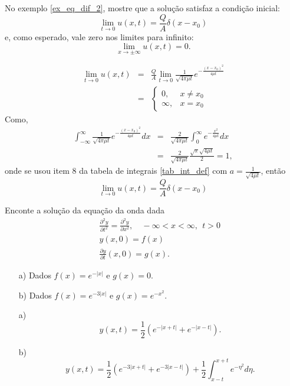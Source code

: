\begin{Exercise}No exemplo \ref{ex_eq_dif_2}, mostre que a solução satisfaz a condição inicial: 
$$
\lim_{t\to 0}u(x,t)=\frac{Q}{A}\delta(x-x_0)
$$
e, como esperado, vale zero nos limites para infinito:
$$
\lim_{x\to\pm\infty}u(x,t)=0.
$$
\end{Exercise}
\begin{Answer}
\begin{eqnarray*}
\lim_{t\to 0} u(x,t)&=&\frac{Q}{A}\lim_{t\to 0} \frac{1}{\sqrt{4\pi \mu t}}e^{-\frac{(x-x_0)^2}{4\mu t}}\\
&=&\left\{\begin{array}{ll}0,&x\neq x_0\\ \infty, &x=x_0\end{array}\right.
\end{eqnarray*}
Como,
\begin{eqnarray*}
\int_{-\infty}^\infty\frac{1}{\sqrt{4\pi \mu t}}e^{-\frac{(x-x_0)^2}{4\mu t}}dx&=&\frac{2}{\sqrt{4\pi \mu t}}\int_{0}^\infty e^{-\frac{x^2}{4\mu t}}dx\\
&=&\frac{2}{\sqrt{4\pi \mu t}}\frac{\sqrt{\pi} \sqrt{4\mu t}}{2}=1,
\end{eqnarray*}
onde se usou item 8 da tabela de integrais \ref{tab_int_def} com $a=\frac{1}{\sqrt{4\mu t}}$, então
$$
\lim_{t\to 0} u(x,t)=\frac{Q}{A} \delta(x-x_0)
$$
\end{Answer}
\begin{Exercise} Enconte a solução da equação da onda dada
\begin{eqnarray*}
&&\frac{\partial^2 y}{\partial t^2}=\frac{\partial^2
y}{\partial x^2},\quad -\infty<x<\infty,\ \ t>0\\
&&y(x,0)=f(x)\\
&&\frac{\partial y}{\partial t}(x,0)=g(x).
\end{eqnarray*}
\begin{itemize}
 \item[a)] Dados $f(x)=e^{-|x|}$ e $g(x)=0$.
  \item[b)] Dados $f(x)=e^{-3|x|}$ e $g(x)=e^{-x^2}$.
\end{itemize}

\end{Exercise}
\begin{Answer}

\begin{itemize}
 \item [a)] 
 \begin{equation*}
y(x,t)=\frac{1}{2} \left( e^{-|x+t|}+e^{-|x-t|}
\right).
\end{equation*}
\item [b)]
 \begin{equation*}
y(x,t)=\frac{1}{2} \left(  e^{-3|x+t|}+e^{-3|x-t|}
\right)+\frac{1}{2}\int_{x-t}^{x+t}e^{-\eta^2}d\eta.
\end{equation*}
\end{itemize}

\end{Answer}


